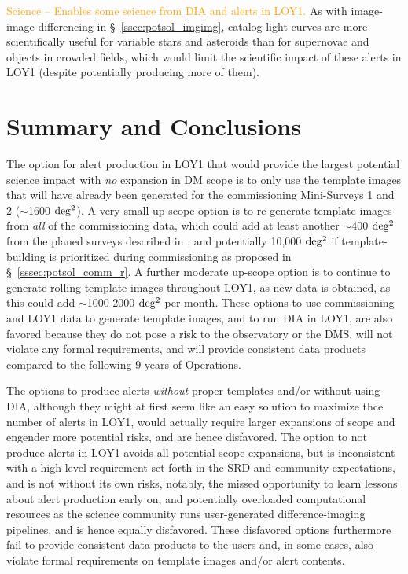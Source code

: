 \documentclass[DM,lsstdraft,toc]{lsstdoc}
\begin{document}
\textcolor{orange}{Science -- Enables some science from DIA and alerts in LOY1.}
As with image-image differencing in \S~\ref{ssec:potsol_imgimg}, catalog light curves are more scientifically useful for variable stars and asteroids than for supernovae and objects in crowded fields, which would limit the scientific impact of these alerts in LOY1 (despite potentially producing more of them).


\clearpage
\section{Summary and Conclusions}\label{sec:rec}

The option for alert production in LOY1 that would provide the largest potential science impact with {\em no} expansion in DM scope is to only use the template images that will have already been generated for the commissioning Mini-Surveys 1 and 2 ($\sim$1600 $\rm deg^2$).
A very small up-scope option is to re-generate template images from {\em all} of the commissioning data, which could add at least another $\sim$400 $\rm deg^2$ from the planed surveys described in , and potentially 10,000 $\rm deg^2$ if template-building is prioritized during commissioning as proposed in \S~\ref{sssec:potsol_comm_r}.
A further moderate up-scope option is to continue to generate rolling template images throughout LOY1, as new data is obtained, as this could add $\sim$1000-2000 $\rm deg^2$ per month.
These options to use commissioning and LOY1 data to generate template images, and to run DIA in LOY1, are also favored because they do not pose a risk to the observatory or the DMS, will not violate any formal requirements, and will provide consistent data products compared to the following 9 years of Operations. 

The options to produce alerts {\it without} proper templates and/or without using DIA, although they might at first seem like an easy solution to maximize thce number of alerts in LOY1, would actually require larger expansions of scope and engender more potential risks, and are hence disfavored.
The  option to not produce alerts in LOY1 avoids all potential scope expansions, but is inconsistent with a high-level requirement set forth in the SRD and community expectations, and is not without its own risks, notably,  the missed opportunity to learn lessons about alert production early on, and potentially overloaded computational resources as the science community runs user-generated difference-imaging pipelines, and is hence equally disfavored. 
These disfavored options furthermore fail to provide consistent data products to the users and, in some cases, also violate formal requirements on template images and/or alert contents.
\end{document}
